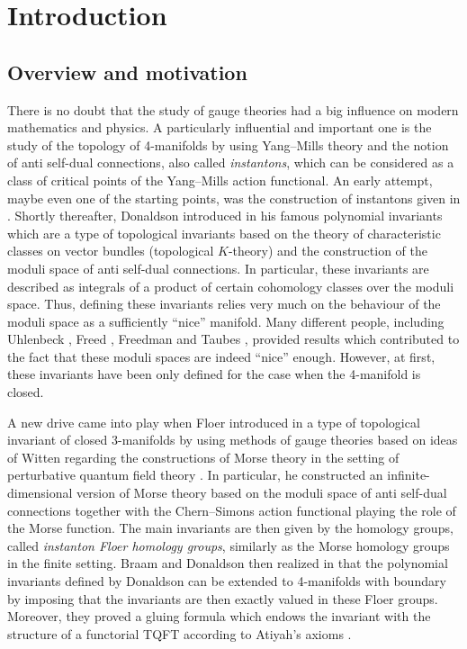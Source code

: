 \documentclass[11pt,colorinlistoftodos]{amsart}
\numberwithin{equation}{subsection}
\theoremstyle{plain}
\theoremstyle{definition}
\theoremstyle{remark}
\begin{document}
\tableofcontents



\section{Introduction}

\subsection{Overview and motivation}
There is no doubt that the study of gauge theories had a big influence on modern mathematics and physics. A particularly influential and important one is the study of the topology of 4-manifolds by using Yang--Mills theory and the notion of anti self-dual connections, also called \emph{instantons}, which can be considered as a class of critical points of the Yang--Mills action functional. An early attempt, maybe even one of the starting points, was the construction of instantons given in \cite{AtiyahDrinfeldHitchinManin1978}. Shortly thereafter, Donaldson introduced in \cite{Donaldson1983,Donaldson1984,Donaldson1990} his famous polynomial invariants which are a type of topological invariants based on the theory of characteristic classes on vector bundles (topological $K$-theory) and the construction of the moduli space of anti self-dual connections. In particular, these invariants are described as integrals of a product of certain cohomology classes over the moduli space. Thus, defining these invariants relies very much on the behaviour of the moduli space as a sufficiently ``nice'' manifold. Many different people, including Uhlenbeck \cite{Uhlenbeck1982,Uhlenbeck1982b}, Freed \cite{FreedUhlenbeck1984}, Freedman \cite{Freedman1982} and Taubes \cite{Taubes1982}, provided results which contributed to the fact that these moduli spaces are indeed ``nice'' enough. However, at first, these invariants have been only defined for the case when the 4-manifold is closed. 

A new drive came into play when Floer introduced in \cite{Floer1988,Floer1989} a type of topological invariant of closed 3-manifolds by using methods of gauge theories based on ideas of Witten regarding the constructions of Morse theory in the setting of perturbative quantum field theory \cite{Witten1982}. In particular, he constructed an infinite-dimensional version of Morse theory based on the moduli space of anti self-dual connections together with the Chern--Simons action functional playing the role of the Morse function. The main invariants are then given by the homology groups, called \emph{instanton Floer homology groups}, similarly as the Morse homology groups in the finite setting.
Braam and Donaldson then realized in \cite{BraamDonaldson1995,Donaldson2002} that the polynomial invariants defined by Donaldson can be extended to 4-manifolds with boundary by imposing that the invariants are then exactly valued in these Floer groups. Moreover, they proved a gluing formula which endows the invariant with the structure of a functorial TQFT according to Atiyah's axioms \cite{Atiyah1988}. 
\end{document}
